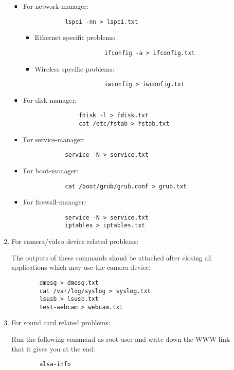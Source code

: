 \documentclass[a4paper,10pt]{article}
\begin{document}
\begin{itemize}
\begin{enumerate}
	\begin{itemize}
		\item For network-manager:
			\begin{verbatim}
			lspci -nn > lspci.txt
			\end{verbatim}
			\begin{itemize}
  			\item Ethernet specific problems:
				\begin{verbatim}
    				ifconfig -a > ifconfig.txt
				\end{verbatim}
  			\item Wireless specific problems:
				\begin{verbatim}
    				iwconfig > iwconfig.txt
				\end{verbatim}
			\end{itemize}
		\item For disk-manager:
			\begin{verbatim}
		    	fdisk -l > fdisk.txt
    			cat /etc/fstab > fstab.txt
			\end{verbatim}
		\item For service-manager:
			\begin{verbatim}
			service -N > service.txt
			\end{verbatim}
		\item For boot-manager:
			\begin{verbatim}
			cat /boot/grub/grub.conf > grub.txt
			\end{verbatim}
		\item For firewall-manager:
			\begin{verbatim}
			service -N > service.txt
			iptables > iptables.txt
			\end{verbatim}
	\end{itemize}
	\item For camera/video device related problems:
		
		The outputs of these commands shoud be attached after closing all applications which may use the camera device:
		\begin{verbatim}
		dmesg > dmesg.txt
		cat /var/log/syslog > syslog.txt
		lsusb > lsusb.txt
		test-webcam > webcam.txt
		\end{verbatim}
	\item For sound card related problems:

		Run the following command as root user and write down the WWW link that it gives you at the end:
		\begin{verbatim}
        alsa-info
		\end{verbatim}
	\end{enumerate}
\end{itemize}
\end{document}
